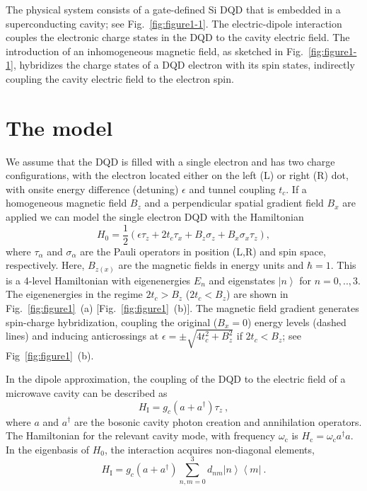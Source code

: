 \documentclass[twocolumn,english,aps,prl,preprint,reprint,showpacs,longbibliography,showkeys]{revtex4-1}
\begin{document}
The physical system consists of a gate-defined Si DQD that is embedded in a superconducting cavity; see Fig.~\ref{fig:figure1-1}. The electric-dipole interaction couples the electronic charge states in the DQD to the cavity electric field. 
The introduction of an inhomogeneous magnetic field, as sketched in Fig.~\ref{fig:figure1-1}, 
 hybridizes the charge states of a DQD electron with its spin states, indirectly coupling the cavity electric field to the electron spin.


\section{The model}
\label{sec:model}



We assume that the DQD is filled with a single electron and has two charge configurations, with the electron located either on the left (L) or  right (R) dot, with onsite energy difference (detuning) $\epsilon$ and tunnel coupling $t_c$. If  a homogeneous magnetic field $B_z$ and a perpendicular spatial gradient field $B_x$ are applied we can model the single electron DQD with the Hamiltonian  
\begin{equation}
H_{0}  = \frac{1}{2}\left(\epsilon \tau_z+2t_c\tau_x+B_z \sigma_z+B_x \sigma_x \tau_z\right), \label{eq:DQD}
\end{equation}
where $\tau_{\alpha}$ and $\sigma_{\alpha}$ are the Pauli operators in position (L,R) and spin space, respectively. Here, $B_{z(x)}$ are the magnetic fields in energy units and $\hbar=1$. This is a 4-level Hamiltonian with eigenenergies $E_n$ and eigenstates $\left|n\right\rangle$ for $n=0,..,3$.
The eigenenergies in the regime $2t_c>B_z$ ($2t_c<B_z$) are shown in 
Fig.~\ref{fig:figure1}~(a) [Fig.~\ref{fig:figure1}~(b)].
The magnetic field gradient generates spin-charge hybridization,  coupling the original ($B_x=0$) energy levels  (dashed lines) and   inducing  anticrossings at $\epsilon=\pm\sqrt{4t_c^2+B_z^2}$ if $2t_c<B_z$; see Fig~\ref{fig:figure1}~(b). 




In the dipole approximation, the coupling of the DQD to the electric field of a microwave cavity can be described as
\begin{equation}
H_{\mathrm{I}}  =g_c\left(a+a^{\dagger}\right)\tau_z\  , \label{eq:cavity-DQD}
\end{equation}
where $a$ and $a^{\dagger}$ are the bosonic cavity photon creation and annihilation  operators. The Hamiltonian for the relevant cavity mode, with frequency $\omega_{\mathrm{c}}$ is $H_{\mathrm{c}}=\omega_{\mathrm{c}} a^{\dagger}a$. 
In the eigenbasis of $H_{0}$, 
the interaction  acquires non-diagonal elements, 
\begin{equation}
H_{\mathrm{I}}  = g_c\left(a+a^{\dagger}\right)\sum_{n,m=0}^{3}d_{nm}\left|n\right\rangle\left\langle m\right|\ . \label{eq:cavity-DQD-eigenbasis}
\end{equation} 
\end{document}

